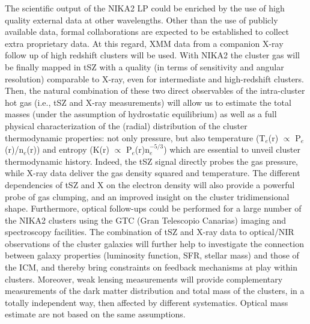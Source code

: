 \documentclass[11pt,a4paper,twoside,graphicx,color]{article}
\begin{document}
\vspace{0.3cm}  
The scientific output of the NIKA2 LP could be enriched by the use of high quality external data at other wavelengths. Other than the use of publicly available data, formal collaborations are expected to be established to collect extra proprietary data. At this regard, XMM data from a companion X-ray follow up of high redshift clusters will be used.
With NIKA2 the cluster gas will be finally mapped in tSZ with a quality (in terms of sensitivity and angular resolution) comparable to X-ray, even for intermediate and high-redshift clusters. Then, the natural combination of these two direct observables of the intra-cluster hot gas (i.e., tSZ and X-ray measurements) will allow us to estimate the total masses (under the assumption of hydrostatic equilibrium) as well as a full physical characterization of the (radial) distribution of the cluster thermodynamic properties: not only pressure, but also temperature  (T$_{e}$(r) $\propto$ P$_{e}$(r)/n$_{e}$(r)) and entropy (K(r) $\propto$ P$_{e}$(r)n$_{e}^{-5/3}$) which are essential to unveil cluster thermodynamic history. Indeed, the tSZ signal directly probes the gas pressure, while X-ray data deliver the gas density squared and temperature. The different dependencies of tSZ and X on the electron density will also provide a powerful probe of gas clumping, and an improved insight on the cluster tridimensional shape. %
Furthermore, optical follow-ups could be performed for a large number of the NIKA2 clusters using the GTC (Gran Telescopio Canarias) imaging and spectroscopy facilities. The combination of tSZ and X-ray data to optical/NIR observations of the cluster galaxies will further help to investigate the connection between galaxy properties (luminosity function, SFR, stellar mass) and those of the ICM, and thereby bring constraints on feedback mechanisms at play within clusters. Moreover, weak lensing measurements will provide complementary measurements of the dark matter distribution and total mass of the clusters, in a totally independent way, then affected by different systematics. Optical mass estimate are not based on the same assumptions.
\end{document}
